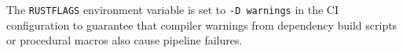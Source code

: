 \documentclass[a4paper, 11pt, oneside]{report}
\begin{document}
The \texttt{RUSTFLAGS} environment variable is set to
\texttt{-D warnings} in the CI configuration to guarantee that
compiler warnings from dependency build scripts or procedural macros
also cause pipeline failures.






\end{document}
